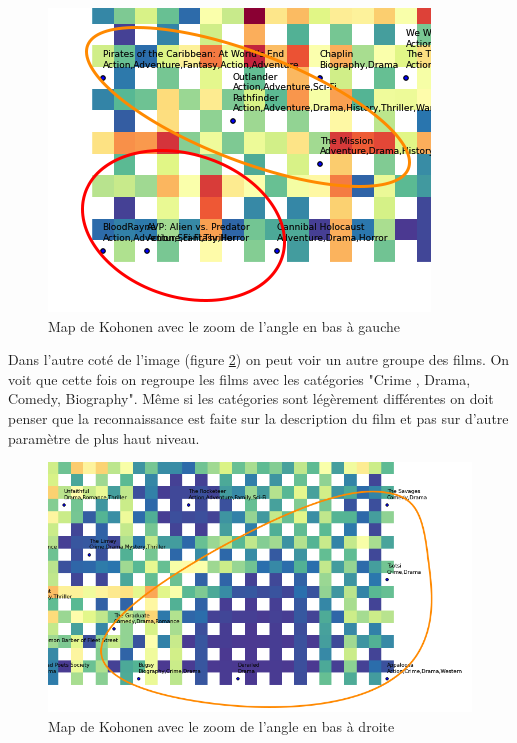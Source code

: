 \begin{figure}[h]
	\centering
	\includegraphics[width=0.5\linewidth]{img/map1zoom2.png}
	\caption{Map de Kohonen avec le zoom de l'angle en bas à gauche}
	\label{map1zoom2}
\end{figure}

\newpage
Dans l'autre coté de l'image (figure \ref{map1zoom3}) on peut voir un autre groupe des films. On voit que cette fois on regroupe les films avec les catégories "Crime , Drama, Comedy, Biography". Même si les catégories sont légèrement différentes on doit penser que la reconnaissance est faite sur la description du film et pas sur d'autre paramètre de plus haut niveau.

\begin{figure}[h]
\centering
\includegraphics[width=0.6\linewidth]{img/map1zoom3.png}
\caption{Map de Kohonen avec le zoom de l'angle en bas à droite}
\label{map1zoom3}
\end{figure}




